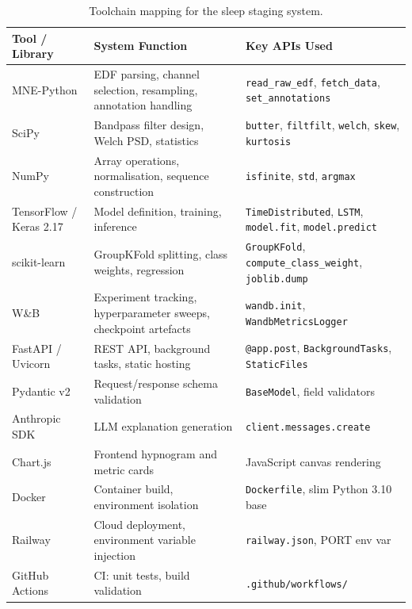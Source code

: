 \documentclass[10pt]{article}
\begin{document}
\begin{table}[h]
\centering
\small
\renewcommand{\arraystretch}{1.2}
\begin{tabular}{|p{3.2cm}|p{4.2cm}|p{4.0cm}|}
\hline
\textbf{Tool / Library} & \textbf{System Function} & \textbf{Key APIs Used} \\\hline
MNE-Python & EDF parsing, channel selection, resampling, annotation handling & \texttt{read\_raw\_edf}, \texttt{fetch\_data}, \texttt{set\_annotations} \\\hline
SciPy & Bandpass filter design, Welch PSD, statistics & \texttt{butter}, \texttt{filtfilt}, \texttt{welch}, \texttt{skew}, \texttt{kurtosis} \\\hline
NumPy & Array operations, normalisation, sequence construction & \texttt{isfinite}, \texttt{std}, \texttt{argmax} \\\hline
TensorFlow / Keras 2.17 & Model definition, training, inference & \texttt{TimeDistributed}, \texttt{LSTM}, \texttt{model.fit}, \texttt{model.predict} \\\hline
scikit-learn & GroupKFold splitting, class weights, regression & \texttt{GroupKFold}, \texttt{compute\_class\_weight}, \texttt{joblib.dump} \\\hline
W\&B & Experiment tracking, hyperparameter sweeps, checkpoint artefacts & \texttt{wandb.init}, \texttt{WandbMetricsLogger} \\\hline
FastAPI / Uvicorn & REST API, background tasks, static hosting & \texttt{@app.post}, \texttt{BackgroundTasks}, \texttt{StaticFiles} \\\hline
Pydantic v2 & Request/response schema validation & \texttt{BaseModel}, field validators \\\hline
Anthropic SDK & LLM explanation generation & \texttt{client.messages.create} \\\hline
Chart.js & Frontend hypnogram and metric cards & JavaScript canvas rendering \\\hline
Docker & Container build, environment isolation & \texttt{Dockerfile}, slim Python 3.10 base \\\hline
Railway & Cloud deployment, environment variable injection & \texttt{railway.json}, PORT env var \\\hline
GitHub Actions & CI: unit tests, build validation & \texttt{.github/workflows/} \\\hline
\end{tabular}
\caption{Toolchain mapping for the sleep staging system.}
\label{tab:toolchain}
\end{table}
\end{document}
